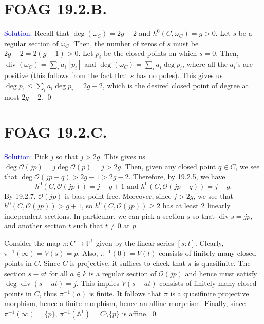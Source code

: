 \documentclass[11pt]{article}
\renewcommand{\AA}{\mathbb{A}}
\newcommand{\PP}{\mathbb{P}}
\newcommand{\cO}{\mathcal{O}}
\newcommand{\Div}{\operatorname{div}}
\newenvironment{solution}{\begin{trivlist}\item[]{\textcolor{blue}{Solution:}}}{\qed \end{trivlist}}
\begin{document}
\newpage

\section*{FOAG 19.2.B.}

\begin{solution}
    Recall that $\deg(\omega_C) = 2g - 2$ and $h^0(C, \omega_C) = g > 0$. Let $s$ be a regular section of $\omega_C$. Then, the number of zeros of $s$ must be $2g - 2 = 2(g - 1) > 0$. Let $p_i$ be the closed points on which $s = 0$. Then, $\Div(\omega_C) = \sum_i a_i [p_i]$ and $\deg(\omega_C) = \sum_i a_i \deg p_i$, where all the $a_i$'s are positive (this follows from the fact that $s$ has no poles). This gives us $\deg p_1 \leq \sum_i a_i \deg p_i = 2g - 2$, which is the desired closed point of degree at most $2g-2$.  
\end{solution}

\newpage

\section*{FOAG 19.2.C.}

\begin{solution}
    Pick $j$ so that $j > 2g$. This gives us $\deg \cO(jp) = j \deg \cO(p) = j > 2g$. Then, given any closed point $q \in C$, we see that $\deg \cO(jp - q) > 2g - 1 > 2g - 2$. Therefore, by 19.2.5, we have 
    \[
        h^0(C, \cO(jp)) = j - g + 1 \text{ and } 
        h^0(C, \cO(jp - q)) = j - g.
    \]
    By 19.2.7, $\cO(jp)$ is base-point-free. Moreover, since $j > 2g$, we see that $h^0(C, \cO(jp)) > g + 1$, so $h^0(C, \cO(jp)) \geq 2$ has at least 2 linearly independent sections. In particular, we can pick a section $s$ so that $\Div s = jp$, and another section $t$ such that $t \neq 0$ at $p$. 

    Consider the map $\pi: C \rightarrow \PP^1$ given by the linear series $[s:t]$. Clearly, $\pi^{-1}(\infty) = V(s) = p$. Also, $\pi^{-1}(0) = V(t)$ consists of finitely many closed points in $C$. Since $C$ is projective, it suffices to check that $\pi$ is quasifinite. The section $s - at$ for all $a \in k$ is a regular section of $\cO(jp)$ and hence must satisfy $\deg \Div (s - at) = j$. This implies $V(s - at)$ consists of finitely many closed points in $C$, thus $\pi^{-1}(a)$ is finite. It follows that $\pi$ is a quasifinite projective morphism, hence a finite morphism, hence an affine morphism. Finally, since $\pi^{-1}(\infty) = \{p\}$, $\pi^{-1}(\AA^1) = C \setminus \{p\}$ is affine. 
\end{solution}
\end{document}
